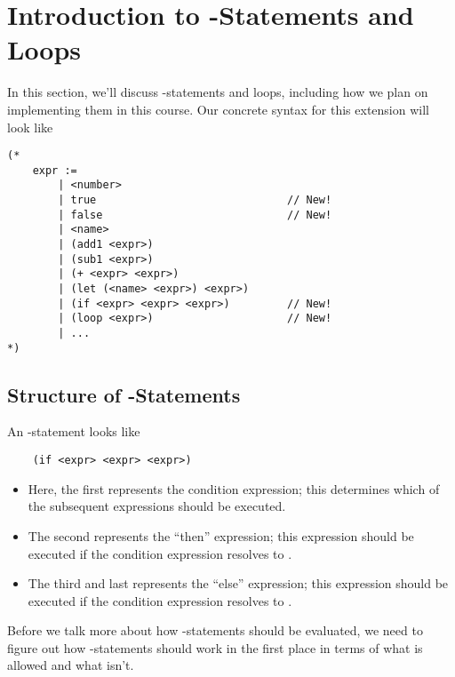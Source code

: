 \documentclass[letterpaper]{article}
\begin{document}
\section{Introduction to -Statements and Loops}
In this section, we'll discuss -statements and loops, including how we plan on implementing them in this course. Our concrete syntax for this extension will look like 
\begin{verbatim}
(*
    expr :=
        | <number>
        | true                              // New!
        | false                             // New!
        | <name>
        | (add1 <expr>)
        | (sub1 <expr>)
        | (+ <expr> <expr>)
        | (let (<name> <expr>) <expr>)
        | (if <expr> <expr> <expr>)         // New!
        | (loop <expr>)                     // New!
        | ... 
*)\end{verbatim}

\subsection{Structure of -Statements}
An -statement looks like 
\begin{verbatim}
    (if <expr> <expr> <expr>)\end{verbatim}

\begin{itemize}
    \item Here, the first  represents the condition expression; this determines which of the subsequent expressions should be executed. 
    \item The second  represents the ``then'' expression; this expression should be executed if the condition expression resolves to .
    \item The third and last  represents the ``else'' expression; this expression should be executed if the condition expression resolves to .
\end{itemize}
Before we talk more about how -statements should be evaluated, we need to figure out how -statements should work in the first place in terms of what is allowed and what isn't. 
\end{document}
